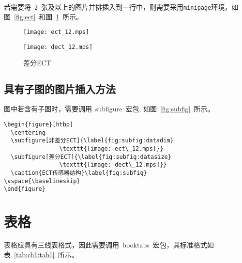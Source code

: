 若需要将~2~张及以上的图片并排插入到一行中，则需要采用\verb|minipage|环境，如图~\ref{fig:ect}~和图~\ref{fig:dect}~所示。
\begin{figure}[htbp]
\centering
\begin{minipage}{0.4\textwidth}
\centering
\texttt{[image: ect\_12.mps]}
\caption{非差分ECT}\label{fig:ect}
\end{minipage}
\hspace{0.1\textwidth}
\begin{minipage}{0.4\textwidth}
\centering
\texttt{[image: dect\_12.mps]}
\caption{差分ECT}\label{fig:dect}
\end{minipage}
\vspace{\baselineskip}
\end{figure}


\subsection{具有子图的图片插入方法}

图中若含有子图时，需要调用~subfigure~宏包, 如图~\ref{fig:subfig}~所示。

\begin{verbatim}
\begin{figure}[htbp]
  \centering
  \subfigure[非差分ECT]{\label{fig:subfig:datadim}
                \texttt{[image: ect\_12.mps]}}
  \subfigure[差分ECT]{\label{fig:subfig:datasize}
                \texttt{[image: dect\_12.mps]}}
  \caption{ECT传感器结构}\label{fig:subfig}
\vspace{\baselineskip}
\end{figure}
\end{verbatim}




\section{表格}

表格应具有三线表格式，因此需要调用~booktabs~宏包，其标准格式如表~\ref{tab:ch1:tab1}~所示。

